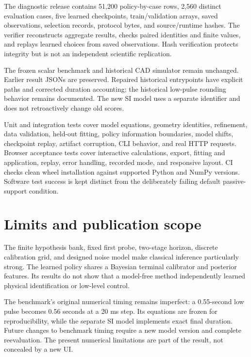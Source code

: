 \documentclass[
  10pt,
]{article}
\begin{document}
The diagnostic release contains 51,200 policy-by-case rows, 2,560
distinct evaluation cases, five learned checkpoints, train/validation
arrays, saved observations, selection records, protocol bytes, and
source/runtime hashes. The verifier reconstructs aggregate results,
checks paired identities and finite values, and replays learned choices
from saved observations. Hash verification protects integrity but is not
an independent scientific replication.

The frozen scalar benchmark and historical CAD simulator remain
unchanged. Earlier result JSONs are preserved. Repaired historical
entrypoints have explicit paths and corrected duration accounting; the
historical low-pulse rounding behavior remains documented. The new SI
model uses a separate identifier and does not retroactively change old
scores.

Unit and integration tests cover model equations, geometry identities,
refinement, data validation, held-out fitting, policy information
boundaries, model shifts, checkpoint replay, artifact corruption, CLI
behavior, and real HTTP requests. Browser acceptance tests cover
interactive calculations, export, fitting and application, replay, error
handling, recorded mode, and responsive layout. CI checks clean wheel
installation against supported Python and NumPy versions. Software test
success is kept distinct from the deliberately failing default
passive-support condition.

\section{Limits and publication
scope}\label{limits-and-publication-scope}

The finite hypothesis bank, fixed first probe, two-stage horizon,
discrete calibration grid, and designed noise model make classical
inference particularly strong. The learned policy shares a Bayesian
terminal calibrator and posterior features. Its results do not show that
a model-free method independently learned physical identification or
low-level control.

The benchmark's original numerical timing remains imperfect: a
0.55-second low pulse becomes 0.56 seconds at a 20 ms step. Its
equations are frozen for reproducibility, while the separate SI model
implements exact final duration. Future changes to benchmark timing
require a new model version and complete reevaluation. The present
numerical limitations are part of the result, not concealed by a new UI.
\end{document}

